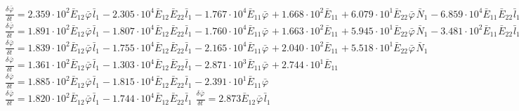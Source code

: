 $\frac{{\delta}^{} {\bar{\varphi}}_{}}{{\delta} {{{t}}_{}}^{}} = 2.359\cdot 10^{2}{{{\bar{E}}_{12}}^{}{{\bar{\varphi}}_{}}^{}{{\bar{l}}_{1}}^{}} - 2.305\cdot 10^{4}{{{\bar{E}}_{12}}^{}{{\bar{E}}_{22}}^{}{{\bar{l}}_{1}}^{}} - 1.767\cdot 10^{4}{{{\bar{E}}_{11}}^{}{{\bar{\varphi}}_{}}^{}} + 1.668\cdot 10^{2}{{{\bar{E}}_{11}}^{}} + 6.079\cdot 10^{1}{{{\bar{E}}_{22}}^{}{{\bar{\varphi}}_{}}^{}{{\bar{N}}_{1}}^{}} - 6.859\cdot 10^{4}{{{\bar{E}}_{11}}^{}{{\bar{E}}_{22}}^{}{{\bar{l}}_{1}}^{}} + 6.802\cdot 10^{2}{{{\bar{E}}_{22}}^{2}{{\bar{l}}_{1}}^{}}$
$\frac{{\delta}^{} {\bar{\varphi}}_{}}{{\delta} {{{t}}_{}}^{}} = 1.891\cdot 10^{2}{{{\bar{E}}_{12}}^{}{{\bar{\varphi}}_{}}^{}{{\bar{l}}_{1}}^{}} - 1.807\cdot 10^{4}{{{\bar{E}}_{12}}^{}{{\bar{E}}_{22}}^{}{{\bar{l}}_{1}}^{}} - 1.760\cdot 10^{4}{{{\bar{E}}_{11}}^{}{{\bar{\varphi}}_{}}^{}} + 1.663\cdot 10^{2}{{{\bar{E}}_{11}}^{}} + 5.945\cdot 10^{1}{{{\bar{E}}_{22}}^{}{{\bar{\varphi}}_{}}^{}{{\bar{N}}_{1}}^{}} - 3.481\cdot 10^{2}{{{\bar{E}}_{11}}^{}{{\bar{E}}_{22}}^{}{{\bar{l}}_{1}}^{}}$
$\frac{{\delta}^{} {\bar{\varphi}}_{}}{{\delta} {{{t}}_{}}^{}} = 1.839\cdot 10^{2}{{{\bar{E}}_{12}}^{}{{\bar{\varphi}}_{}}^{}{{\bar{l}}_{1}}^{}} - 1.755\cdot 10^{4}{{{\bar{E}}_{12}}^{}{{\bar{E}}_{22}}^{}{{\bar{l}}_{1}}^{}} - 2.165\cdot 10^{4}{{{\bar{E}}_{11}}^{}{{\bar{\varphi}}_{}}^{}} + 2.040\cdot 10^{2}{{{\bar{E}}_{11}}^{}} + 5.518\cdot 10^{1}{{{\bar{E}}_{22}}^{}{{\bar{\varphi}}_{}}^{}{{\bar{N}}_{1}}^{}}$
$\frac{{\delta}^{} {\bar{\varphi}}_{}}{{\delta} {{{t}}_{}}^{}} = 1.361\cdot 10^{2}{{{\bar{E}}_{12}}^{}{{\bar{\varphi}}_{}}^{}{{\bar{l}}_{1}}^{}} - 1.303\cdot 10^{4}{{{\bar{E}}_{12}}^{}{{\bar{E}}_{22}}^{}{{\bar{l}}_{1}}^{}} - 2.871\cdot 10^{3}{{{\bar{E}}_{11}}^{}{{\bar{\varphi}}_{}}^{}} + 2.744\cdot 10^{1}{{{\bar{E}}_{11}}^{}}$
$\frac{{\delta}^{} {\bar{\varphi}}_{}}{{\delta} {{{t}}_{}}^{}} = 1.885\cdot 10^{2}{{{\bar{E}}_{12}}^{}{{\bar{\varphi}}_{}}^{}{{\bar{l}}_{1}}^{}} - 1.815\cdot 10^{4}{{{\bar{E}}_{12}}^{}{{\bar{E}}_{22}}^{}{{\bar{l}}_{1}}^{}} - 2.391\cdot 10^{1}{{{\bar{E}}_{11}}^{}{{\bar{\varphi}}_{}}^{}}$
$\frac{{\delta}^{} {\bar{\varphi}}_{}}{{\delta} {{{t}}_{}}^{}} = 1.820\cdot 10^{2}{{{\bar{E}}_{12}}^{}{{\bar{\varphi}}_{}}^{}{{\bar{l}}_{1}}^{}} - 1.744\cdot 10^{4}{{{\bar{E}}_{12}}^{}{{\bar{E}}_{22}}^{}{{\bar{l}}_{1}}^{}}$
$\frac{{\delta}^{} {\bar{\varphi}}_{}}{{\delta} {{{t}}_{}}^{}} = 2.873{{{\bar{E}}_{12}}^{}{{\bar{\varphi}}_{}}^{}{{\bar{l}}_{1}}^{}}$
